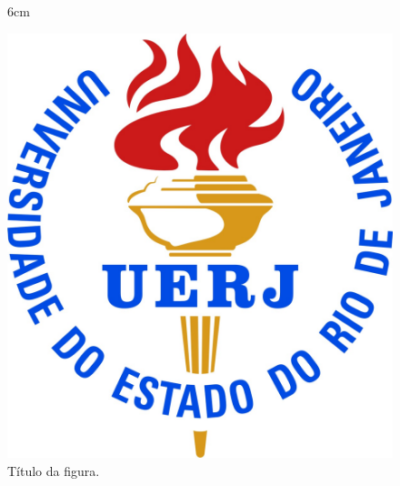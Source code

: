 \documentclass[a4paper,12pt,oneside,onecolumn,final,fleqn]{repUERJ}
\begin{document}

\begin{figure}[!hbpt]{6cm}
  \caption{Título da figura.} \label{rotulo}
  \includegraphics[width=\hsize]{logo_uerj_cor.jpg}
\end{figure}
\end{document}
